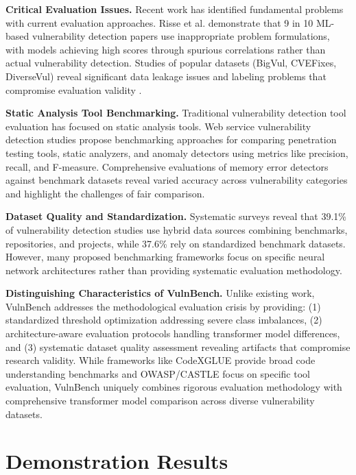 \documentclass[letterpaper]{article}
\begin{document}
\textbf{Critical Evaluation Issues.} Recent work has identified fundamental problems with current evaluation approaches. Risse et al. \citep{risse2025top} demonstrate that 9 in 10 ML-based vulnerability detection papers use inappropriate problem formulations, with models achieving high scores through spurious correlations rather than actual vulnerability detection. Studies of popular datasets (BigVul, CVEFixes, DiverseVul) reveal significant data leakage issues and labeling problems that compromise evaluation validity \citep{ullah2024vulnerability}.

\textbf{Static Analysis Tool Benchmarking.} Traditional vulnerability detection tool evaluation has focused on static analysis tools. Web service vulnerability detection studies \citep{antunes2010benchmarking} propose benchmarking approaches for comparing penetration testing tools, static analyzers, and anomaly detectors using metrics like precision, recall, and F-measure. Comprehensive evaluations of memory error detectors \citep{zhang2021evaluating} against benchmark datasets reveal varied accuracy across vulnerability categories and highlight the challenges of fair comparison.

\textbf{Dataset Quality and Standardization.} Systematic surveys \citep{systematic2024survey} reveal that 39.1\% of vulnerability detection studies use hybrid data sources combining benchmarks, repositories, and projects, while 37.6\% rely on standardized benchmark datasets. However, many proposed benchmarking frameworks \citep{lin2020deep} focus on specific neural network architectures rather than providing systematic evaluation methodology.

\textbf{Distinguishing Characteristics of VulnBench.} Unlike existing work, VulnBench addresses the methodological evaluation crisis by providing: (1) standardized threshold optimization addressing severe class imbalances, (2) architecture-aware evaluation protocols handling transformer model differences, and (3) systematic dataset quality assessment revealing artifacts that compromise research validity. While frameworks like CodeXGLUE provide broad code understanding benchmarks and OWASP/CASTLE focus on specific tool evaluation, VulnBench uniquely combines rigorous evaluation methodology with comprehensive transformer model comparison across diverse vulnerability datasets.
\section{Demonstration Results}
\end{document}
